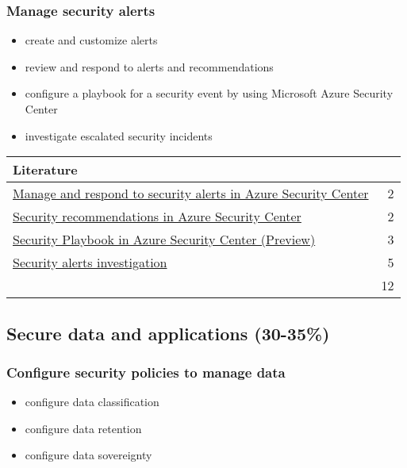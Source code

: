 \subsubsection{Manage security alerts}
\begin{itemize}
\item create and customize alerts 
\item review and respond to alerts and recommendations 
\item configure a playbook for a security event by using Microsoft Azure Security Center 
\item investigate escalated security incidents 
\end{itemize}

\begin{tabular}{p{14cm} | r}
\textbf{Literature} & \\
\hline
\href{https://docs.microsoft.com/en-us/azure/security-center/security-center-managing-and-responding-alerts}{Manage and respond to security alerts in Azure Security Center} & 2 \\
\href{https://docs.microsoft.com/en-us/azure/security-center/security-center-recommendations}{Security recommendations in Azure Security Center} & 2 \\
\href{https://docs.microsoft.com/en-us/azure/security-center/security-center-playbooks}{Security Playbook in Azure Security Center (Preview)} & 3 \\
\href{https://docs.microsoft.com/en-us/azure/security-center/security-center-features-retirement-july2019#menu_investigate}{Security alerts investigation} & 5 \\
\cline{2-2} 
 & 12 \\
\end{tabular}

\clearpage
\subsection{Secure data and applications (30-35\%)}
\subsubsection{Configure security policies to manage data}
\begin{itemize}
\item configure data classification 
\item configure data retention 
\item configure data sovereignty 
\end{itemize}

